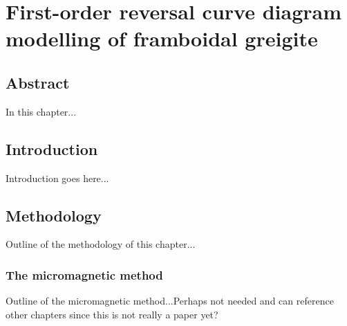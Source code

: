 \chapter{First-order reversal curve diagram modelling of framboidal greigite}
\label{ch:res-4}

\section*{Abstract}
In this chapter...\par

\section{Introduction}
Introduction goes here...\par

\section{Methodology}
Outline of the methodology of this chapter...\par

\subsection{The micromagnetic method}
Outline of the micromagnetic method...Perhaps not needed and can reference other chapters since this is not really a paper yet?\par

